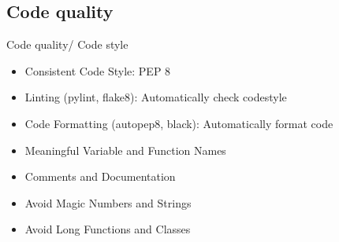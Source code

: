 \subsection{Code quality}
\begin{frame}
    \begin{content}{Code quality/ Code style}
        \begin{itemize}
            \item Consistent Code Style: PEP 8
            \item Linting (pylint, flake8): Automatically check codestyle 
            \item Code Formatting (autopep8, black): Automatically format code
            \item Meaningful Variable and Function Names
            \item Comments and Documentation
            \item Avoid Magic Numbers and Strings
            \item Avoid Long Functions and Classes
        \end{itemize}
    \end{content}
\end{frame}